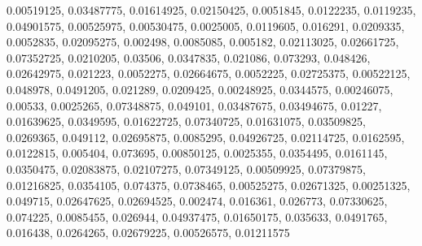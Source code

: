 0.00519125, 0.03487775, 0.01614925, 0.02150425, 0.0051845, 0.0122235, 0.0119235, 0.04901575, 0.00525975, 0.00530475, 0.0025005, 0.0119605, 0.016291, 0.0209335, 0.0052835, 0.02095275, 0.002498, 0.0085085, 0.005182, 0.02113025, 0.02661725, 0.07352725, 0.0210205, 0.03506, 0.0347835, 0.021086, 0.073293, 0.048426, 0.02642975, 0.021223, 0.0052275, 0.02664675, 0.0052225, 0.02725375, 0.00522125, 0.048978, 0.0491205, 0.021289, 0.0209425, 0.00248925, 0.0344575, 0.00246075, 0.00533, 0.0025265, 0.07348875, 0.049101, 0.03487675, 0.03494675, 0.01227, 0.01639625, 0.0349595, 0.01622725, 0.07340725, 0.01631075, 0.03509825, 0.0269365, 0.049112, 0.02695875, 0.0085295, 0.04926725, 0.02114725, 0.0162595, 0.0122815, 0.005404, 0.073695, 0.00850125, 0.0025355, 0.0354495, 0.0161145, 0.0350475, 0.02083875, 0.02107275, 0.07349125, 0.00509925, 0.07379875, 0.01216825, 0.0354105, 0.074375, 0.0738465, 0.00525275, 0.02671325, 0.00251325, 0.049715, 0.02647625, 0.02694525, 0.002474, 0.016361, 0.026773, 0.07330625, 0.074225, 0.0085455, 0.026944, 0.04937475, 0.01650175, 0.035633, 0.0491765, 0.016438, 0.0264265, 0.02679225, 0.00526575, 0.01211575